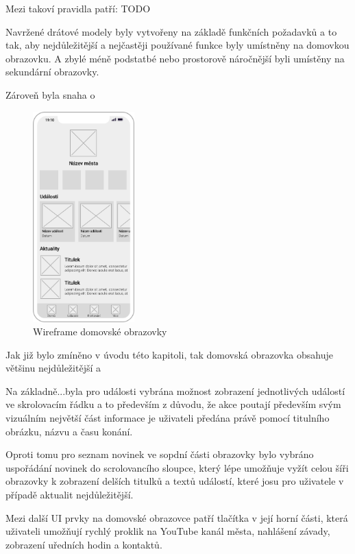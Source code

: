 Mezi takoví pravidla patří:
TODO

Navržené drátové modely byly vytvořeny na základě funkčních požadavků a to tak, aby nejdůležitější a nejčastěji používané funkce byly 
umístněny na domovkou obrazovku. A zbylé méně podstatbé nebo prostorově náročnější byli umístěny na sekundární obrazovky.

Zároveň byla snaha o 

\pagebreak


\begin{figure}
  \centering
  \includegraphics[width=0.35\textwidth]{home_wireframe.png}
  \caption{Wireframe domovské obrazovky}
\end{figure}

Jak již bylo zmíněno v úvodu této kapitoli, tak domovská obrazovka obsahuje většinu nejdůležitější a 

Na základně...byla pro události vybrána možnost zobrazení jednotlivých událostí ve skrolovacím řádku a to především z důvodu,
 že akce poutají především svým vizuálním největší část informace je uživateli předána právě pomocí titulního obrázku, názvu
a času konání.

Oproti tomu pro seznam novinek ve sopdní části obrazovky bylo vybráno uspořádání novinek do scrolovancího sloupce, který lépe umožňuje 
vyžít celou šíři obrazovky k zobrazení delších titulků a textů událostí, které josu pro uživatele v případě aktualit nejdůležitější.

Mezi další UI prvky na domovské obrazovce patří tlačítka v její horní části, která uživateli umožňují rychlý proklik na YouTube kanál města,
nahlášení závady, zobrazení uředních hodin a kontaktů.

